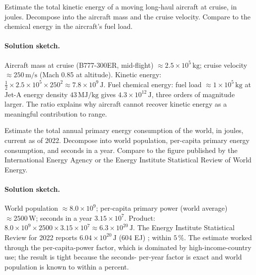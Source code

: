 \begin{exercise}
Estimate the total kinetic energy of a moving long-haul aircraft at
cruise, in joules. Decompose into the aircraft mass and the cruise
velocity. Compare to the chemical energy in the aircraft's fuel
load.
\end{exercise}

\paragraph{Solution sketch.}
Aircraft mass at cruise (B777-300ER, mid-flight) $\approx 2.5
\times 10^{5} \,\si{\kilo\gram}$; cruise velocity $\approx 250
\,\si{\meter\per\second}$ (Mach 0.85 at altitude). Kinetic
energy: $\tfrac{1}{2} \times 2.5 \times 10^{5} \times 250^{2}
\approx 7.8 \times 10^{9} \,\si{\joule}$. Fuel chemical energy:
fuel load $\approx 1 \times 10^{5} \,\si{\kilo\gram}$ at Jet-A
energy density $43 \,\si{\mega\joule\per\kilo\gram}$ gives
$4.3 \times 10^{12} \,\si{\joule}$, three orders of magnitude
larger. The ratio explains why aircraft cannot recover kinetic
energy as a meaningful contribution to range.

\begin{exercise}
Estimate the total annual primary energy consumption of the world,
in joules, current as of 2022. Decompose into world population,
per-capita primary energy consumption, and seconds in a year.
Compare to the figure published by the International Energy Agency
or the Energy Institute Statistical Review of World Energy.
\end{exercise}

\paragraph{Solution sketch.}
World population $\approx 8.0 \times 10^{9}$; per-capita primary
power (world average) $\approx 2500 \,\si{\watt}$; seconds in a
year $3.15 \times 10^{7}$. Product: $8.0 \times 10^{9} \times 2500
\times 3.15 \times 10^{7} \approx 6.3 \times 10^{20} \,\si{\joule}$.
The Energy Institute Statistical Review for 2022 reports $6.04
\times 10^{20} \,\si{\joule}$ (604 EJ)
\cite{data:ch09-bp-statistical-2024}; within $5\,\%$. The estimate
worked through the per-capita-power factor, which is dominated by
high-income-country use; the result is tight because the seconds-
per-year factor is exact and world population is known to within
a percent.


